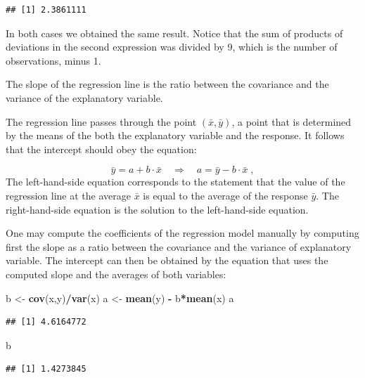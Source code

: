 \documentclass[]{krantz}
\makeatletter
\newenvironment{Shaded}{\begin{snugshade}}{\end{snugshade}}
\newcommand{\KeywordTok}[1]{\textcolor[rgb]{0.13,0.29,0.53}{\textbf{#1}}}
\newcommand{\StringTok}[1]{\textcolor[rgb]{0.31,0.60,0.02}{#1}}
\newcommand{\OperatorTok}[1]{\textcolor[rgb]{0.81,0.36,0.00}{\textbf{#1}}}
\newcommand{\NormalTok}[1]{#1}
\newenvironment{kframe}{%
\medskip{}
\setlength{\fboxsep}{.8em}
 \def\at@end@of@kframe{}%
 \ifinner\ifhmode%
  \def\at@end@of@kframe{\end{minipage}}%
  \begin{minipage}{\columnwidth}%
 \fi\fi%
 \def\FrameCommand##1{\hskip\@totalleftmargin \hskip-\fboxsep
 \colorbox{shadecolor}{##1}\hskip-\fboxsep
     \hskip-\linewidth \hskip-\@totalleftmargin \hskip\columnwidth}%
 \MakeFramed {\advance\hsize-\width
   \@totalleftmargin\z@ \linewidth\hsize
   \@setminipage}}%
 {\par\unskip\endMakeFramed%
 \at@end@of@kframe}
\renewenvironment{Shaded}{\begin{kframe}}{\end{kframe}}
\theoremstyle{definition}
\theoremstyle{definition}
\theoremstyle{definition}
\theoremstyle{remark}
\makeatother
\begin{document}
\begin{verbatim}
## [1] 2.3861111
\end{verbatim}

In both cases we obtained the same result. Notice that the sum of
products of deviations in the second expression was divided by 9, which
is the number of observations, minus 1.

The slope of the regression line is the ratio between the covariance and
the variance of the explanatory variable.

The regression line passes through the point \((\bar x, \bar y)\), a
point that is determined by the means of the both the explanatory
variable and the response. It follows that the intercept should obey the
equation:

\[\bar y = a + b\cdot \bar x \quad\Longrightarrow\quad a = \bar y - b\cdot \bar x\;,\]
The left-hand-side equation corresponds to the statement that the value
of the regression line at the average \(\bar x\) is equal to the average
of the response \(\bar y\). The right-hand-side equation is the solution
to the left-hand-side equation.

One may compute the coefficients of the regression model manually by
computing first the slope as a ratio between the covariance and the
variance of explanatory variable. The intercept can then be obtained by
the equation that uses the computed slope and the averages of both
variables:

\begin{Shaded}
\begin{Highlighting}[]
\NormalTok{b <-}\StringTok{ }\KeywordTok{cov}\NormalTok{(x,y)}\OperatorTok{/}\KeywordTok{var}\NormalTok{(x)}
\NormalTok{a <-}\StringTok{ }\KeywordTok{mean}\NormalTok{(y) }\OperatorTok{-}\StringTok{ }\NormalTok{b}\OperatorTok{*}\KeywordTok{mean}\NormalTok{(x)}
\NormalTok{a}
\end{Highlighting}
\end{Shaded}

\begin{verbatim}
## [1] 4.6164772
\end{verbatim}

\begin{Shaded}
\begin{Highlighting}[]
\NormalTok{b}
\end{Highlighting}
\end{Shaded}

\begin{verbatim}
## [1] 1.4273845
\end{verbatim}
\end{document}
